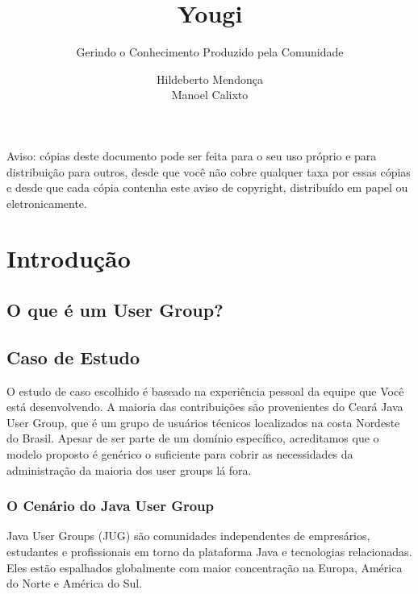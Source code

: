 \documentclass[envcountsame,envcountchap]{svmono}
\author{Hildeberto Mendonça \\ Manoel Calixto}
\title{Yougi}
\subtitle{Gerindo o Conhecimento Produzido pela Comunidade}
\begin{document}
\maketitle

\frontmatter

\thispagestyle{empty}
\vspace*{3.5cm}
\begin{flushleft}
Aviso: cópias deste documento pode ser feita para o seu uso próprio e para distribuição para outros, desde que você não cobre qualquer taxa por essas cópias e desde que cada cópia contenha este aviso de copyright, distribuído em papel ou eletronicamente.
\end{flushleft}

\tableofcontents

\listoffigures

\listoftables

\mainmatter

\chapter{Introdução}

\section{O que é um User Group?}

\section{Caso de Estudo}

O estudo de caso escolhido é baseado na experiência pessoal da equipe que Você está desenvolvendo. A maioria das contribuições são provenientes do Cear\'{a} Java User Group, que é um grupo de usuários técnicos localizados na costa Nordeste do Brasil. Apesar de ser parte de um domínio específico, acreditamos que o modelo proposto é genérico o suficiente para cobrir as necessidades da administração da maioria dos user groups lá fora.

\subsection{O Cenário do Java User Group}

Java User Groups (JUG) são comunidades independentes de empresários, estudantes e profissionais em torno da plataforma Java e tecnologias relacionadas. Eles estão espalhados globalmente com maior concentração na Europa, América do Norte e América do Sul.
\end{document}
